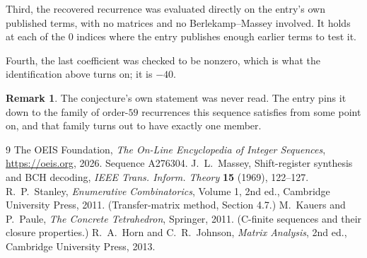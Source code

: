 \documentclass[11pt,a4paper]{article}
\theoremstyle{plain}
\theoremstyle{definition}
\newtheorem{remark}[theorem]{Remark}
\begin{document}
Third, the recovered recurrence was evaluated directly on the entry's own published terms, with
no matrices and no Berlekamp--Massey involved. It holds at each of the $0$ indices where
the entry publishes enough earlier terms to test it.

Fourth, the last coefficient was checked to be nonzero, which is what the identification above
turns on; it is $-40$.

\begin{remark}
The conjecture's own statement was never read. The entry pins it down to the family of
order-$59$ recurrences this sequence satisfies from some point on, and that family turns
out to have exactly one member.
\end{remark}

\begin{thebibliography}{9}
 The OEIS Foundation, \emph{The On-Line Encyclopedia of Integer
Sequences}, \url{https://oeis.org}, 2026. Sequence A276304.
 J.~L.~Massey, Shift-register synthesis and BCH decoding, \emph{IEEE
Trans. Inform. Theory} \textbf{15} (1969), 122--127.
 R.~P.~Stanley, \emph{Enumerative Combinatorics}, Volume 1, 2nd ed.,
Cambridge University Press, 2011. (Transfer-matrix method, Section 4.7.)
 M.~Kauers and P.~Paule, \emph{The Concrete Tetrahedron}, Springer, 2011.
(C-finite sequences and their closure properties.)
 R.~A.~Horn and C.~R.~Johnson, \emph{Matrix Analysis}, 2nd ed., Cambridge
University Press, 2013.
\end{thebibliography}
\end{document}
